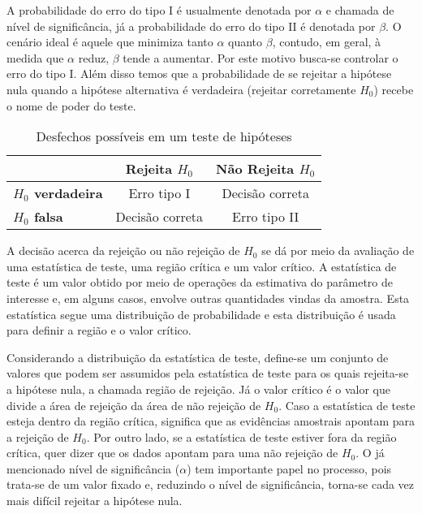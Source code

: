 A probabilidade do erro do tipo I é usualmente denotada por $\alpha$ e chamada de nível de significância, já a probabilidade do erro do tipo II é denotada por $\beta$. O cenário ideal é aquele que minimiza tanto $\alpha$ quanto $\beta$, contudo, em geral, à medida que $\alpha$ reduz, $\beta$ tende a aumentar. Por este motivo busca-se controlar o erro do tipo I. Além disso temos que a probabilidade de se rejeitar a hipótese nula quando a hipótese alternativa é verdadeira (rejeitar corretamente $H_0$) recebe o nome de poder do teste.

\begin{table}[h]
\centering
\begin{tabular}{l|cc}
\hline
\multicolumn{1}{c|}{}    & \textbf{Rejeita $H_0$} & \textbf{Não Rejeita $H_0$} \\ \hline
\textbf{$H_0$ verdadeira} & Erro tipo I           & Decisão correta           \\
\textbf{$H_0$ falsa}      & Decisão correta       & Erro tipo II              \\ \hline
\end{tabular}
\caption{Desfechos possíveis em um teste de hipóteses}
\label{tab:desfechos}
\end{table}

A decisão acerca da rejeição ou não rejeição de $H_0$ se dá por meio da avaliação de uma estatística de teste, uma região crítica e um valor crítico. A estatística de teste é um valor obtido por meio de operações da estimativa do parâmetro de interesse e, em alguns casos, envolve outras quantidades vindas da amostra. Esta estatística segue uma distribuição de probabilidade e esta distribuição é usada para definir a região e o valor crítico.

Considerando a distribuição da estatística de teste, define-se um conjunto de valores que podem ser assumidos pela estatística de teste para os quais rejeita-se a hipótese nula, a chamada região de rejeição. Já o valor crítico é o valor que divide a área de rejeição da área de não rejeição de $H_0$. Caso a estatística de teste esteja dentro da região crítica, significa que as evidências amostrais apontam para a rejeição de $H_0$. Por outro lado, se a estatística de teste estiver fora da região crítica, quer dizer que os dados apontam para uma não rejeição de $H_0$. O já mencionado nível de significância ($\alpha$) tem importante papel no processo, pois trata-se de um valor fixado e, reduzindo o nível de significância, torna-se cada vez mais difícil rejeitar a hipótese nula.

